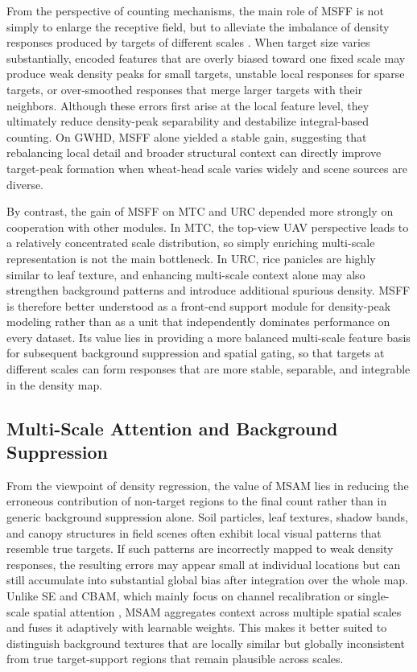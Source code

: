 \documentclass[a4paper,fleqn]{cas-sc}
\begin{document}
	From the perspective of counting mechanisms, the main role of MSFF is not simply to enlarge the receptive field, but to alleviate the imbalance of density responses produced by targets of different scales \cite{ref20,ref4}. When target size varies substantially, encoded features that are overly biased toward one fixed scale may produce weak density peaks for small targets, unstable local responses for sparse targets, or over-smoothed responses that merge larger targets with their neighbors. Although these errors first arise at the local feature level, they ultimately reduce density-peak separability and destabilize integral-based counting. On GWHD, MSFF alone yielded a stable gain, suggesting that rebalancing local detail and broader structural context can directly improve target-peak formation when wheat-head scale varies widely and scene sources are diverse.
	
	By contrast, the gain of MSFF on MTC and URC depended more strongly on cooperation with other modules. In MTC, the top-view UAV perspective leads to a relatively concentrated scale distribution, so simply enriching multi-scale representation is not the main bottleneck. In URC, rice panicles are highly similar to leaf texture, and enhancing multi-scale context alone may also strengthen background patterns and introduce additional spurious density. MSFF is therefore better understood as a front-end support module for density-peak modeling rather than as a unit that independently dominates performance on every dataset. Its value lies in providing a more balanced multi-scale feature basis for subsequent background suppression and spatial gating, so that targets at different scales can form responses that are more stable, separable, and integrable in the density map.
	
	\subsection{Multi-Scale Attention and Background Suppression}
	
	From the viewpoint of density regression, the value of MSAM lies in reducing the erroneous contribution of non-target regions to the final count rather than in generic background suppression alone. Soil particles, leaf textures, shadow bands, and canopy structures in field scenes often exhibit local visual patterns that resemble true targets. If such patterns are incorrectly mapped to weak density responses, the resulting errors may appear small at individual locations but can still accumulate into substantial global bias after integration over the whole map. Unlike SE and CBAM, which mainly focus on channel recalibration or single-scale spatial attention \cite{ref29,ref27}, MSAM aggregates context across multiple spatial scales and fuses it adaptively with learnable weights. This makes it better suited to distinguish background textures that are locally similar but globally inconsistent from true target-support regions that remain plausible across scales.
	
\end{document}
